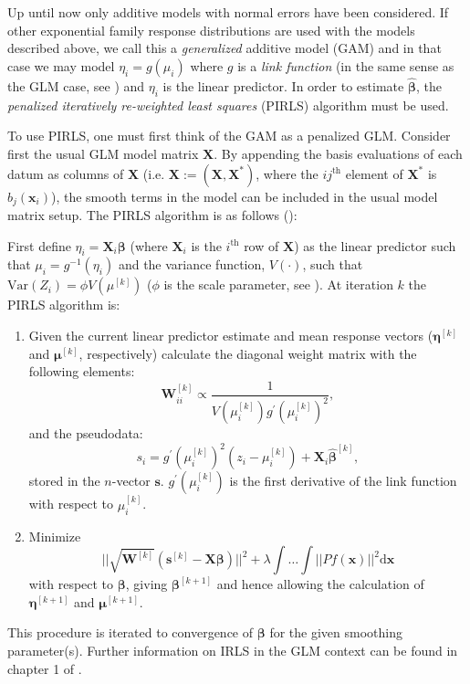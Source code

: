 Up until now only additive models with normal errors have been considered. If other exponential family response distributions are used with the models described above, we call this a \textit{generalized} additive model (GAM)  and in that case we may model $\eta_i=g(\mu_i)$ where $g$ is a \textit{link function} (in the same sense as the GLM case, see \cite[p. 8]{GEEbook}) and $\eta_i$ is the linear predictor. In order to estimate $\bm{\hat{\beta}}$, the \textit{penalized iteratively re-weighted least squares} (PIRLS) algorithm must be used. 

To use PIRLS, one must first think of the GAM as a penalized GLM. Consider first the usual GLM model matrix $\mathbf{X}$. By appending the basis evaluations of each datum as columns of $\mathbf{X}$ (i.e. $\mathbf{X}:=\left ( \mathbf{X},\mathbf{X}^* \right )$, where the $ij^\text{th}$ element of $\mathbf{X}^*$ is  $b_j(\mathbf{x}_i)$), the smooth terms in the model can be included in the usual model matrix setup. The PIRLS algorithm is as follows (\cite[p. 138]{simonbook}):

First define $\eta_i = \mathbf{X}_i\bm{\beta}$ (where $\mathbf{X}_i$ is the $i^\text{th}$ row of $\mathbf{X}$) as the linear predictor such that $\mu_i = g^{-1}(\eta_i)$ and the variance function, $V(\cdot)$, such that $\text{Var}\left ( Z_i \right ) = \phi V(\mu^{[k]})$ ($\phi$ is the scale parameter, see \cite[p. 62]{simonbook}). At iteration $k$ the PIRLS algorithm is:
\begin{enumerate}
\item Given the current linear predictor estimate and mean response vectors ($\bm{\eta}^{[k]}$ and $\bm{\mu}^{[k]}$, respectively) calculate the diagonal weight matrix with the following elements:
\begin{equation*}
\mathbf{W}^{[k]}_{ii}  \propto \frac{1}{V(\mu_i^{[k]})g^\prime(\mu_i^{[k]})^2},
\end{equation*}
and the pseudodata:
\begin{equation*}
s_i = g^\prime(\mu_i^{[k]})^2(z_i-\mu_i^{[k]}) + \mathbf{X}_i\bm{\hat{\beta}}^{[k]},
\end{equation*}
stored in the $n$-vector $\mathbf{s}$. $g^\prime(\mu_i^{[k]})$ is the first derivative of the link function with respect to $\mu_i^{[k]}$.
\item Minimize
\begin{equation*}
\lvert \lvert \sqrt{\mathbf{W}^{[k]}} (\mathbf{s}^{[k]} - \mathbf{X}\bm{\beta})  \rvert \rvert^2 + \lambda \int \dots \int \lvert \lvert P f(\mathbf{x})\rvert \rvert^2 \text{d}\mathbf{x}
\end{equation*}
with respect to $\bm{\beta}$, giving $\bm{\beta}^{[k+1]}$ and hence allowing the calculation of $\bm{\eta}^{[k+1]}$ and $\bm{\mu}^{[k+1]}$.
\end{enumerate}
This procedure is iterated to convergence of $\bm{\beta}$ for the given smoothing parameter(s). Further information on IRLS in the GLM context can be found in chapter 1 of .

